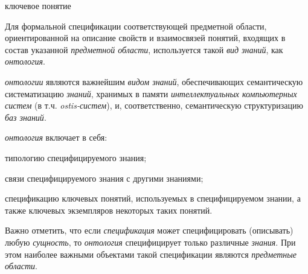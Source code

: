 \begin{SCn}
	\begin{scnrelfromlist}{ключевое понятие}
	\end{scnrelfromlist}
\end{SCn}

Для формальной спецификации соответствующей предметной области, ориентированной на описание свойств и взаимосвязей понятий, входящих в состав указанной \textit{предметной области}, используется такой \textit{вид знаний}, как \textit{онтология}.

\textit{онтологии} являются важнейшим \textit{видом знаний}, обеспечивающих семантическую систематизацию \textit{знаний}, хранимых в памяти \textit{интеллектуальных компьютерных систем} (в т.ч. \textit{ostis-систем}), и, соответственно, семантическую структуризацию \textit{баз знаний}.

\begin{SCn}
\end{SCn}

\textit{онтология} включает в себя:
\begin{textitemize}
	\item {типологию специфицируемого знания};
	\item{связи специфицируемого знания с другими знаниями};
	\item{спецификацию ключевых понятий, используемых в специфицируемом знании, а также ключевых экземпляров некоторых таких понятий}.
\end{textitemize}

Важно отметить, что если \textit{спецификация} может специфицировать (описывать) любую \textit{сущность}, то \textit{онтология} специфицирует только различные \textit{знания}. При этом наиболее важными объектами такой спецификации являются \textit{предметные области}.

